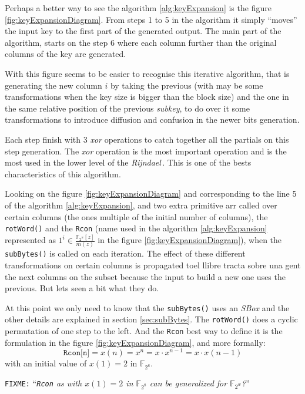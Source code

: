 \documentclass[10pt,a4paper,twoside]{llncs}
\newcommand{\fixme}[1]{\texttt{\color{red}FIXME:} ``\emph{#1}''}
\newcommand{\rijndael}{\emph{Rijndael}}
\newcommand{\Fpn}[2]{\ensuremath{\mathbb{F}_{#1^#2}}}
\begin{document}
Perhaps a better way to see the algorithm \ref{alg:keyExpansion} is the figure \ref{fig:keyExpansionDiagram}. From steps 1 to 5 in the algorithm it simply ``moves'' the input key to the first part of the generated output. The main part of the algorithm, starts on the step 6 where each column further than the original columns of the key are generated.

With this figure seems to be easier to recognise this iterative algorithm, that is generating the new column $i$ by taking the previous (with may be some transformations when the key size is bigger than the block size) and the one in the same relative position of the previous \emph{subkey}, to do over it some transformations to introduce diffusion and confusion in the newer bits generation.

Each step finish with 3 \emph{xor} operations to catch together all the partials on this step generation. The \emph{xor} operation is the most important operation and is the most used in the lower level of the \rijndael\,. This is one of the bests characteristics of this algorithm.

Looking on the figure \ref{fig:keyExpansionDiagram} and corresponding to the line 5 of the algorithm \ref{alg:keyExpansion}, and two extra primitive arr called over certain columns (the ones multiple of the initial number of columns), the {\tt rotWord()} and the {\tt Rcon} (name used in the algorithm \ref{alg:keyExpansion} represented as $1^{i} \in\frac{\mathbb{F}_{2^{w}}[z]}{m(z)}$ in the figure \ref{fig:keyExpansionDiagram}), when the {\tt subBytes()} is called on each iteration. The effect of these different transformations on certain columns is propagated toel llibre tracta sobre una gent the next columns on the subset because the input to build a new one uses the previous. But lets seen a bit what they do.

At this point we only need to know that the {\tt subBytes()} uses an \emph{SBox} and the other details are explained in section \ref{sec:subBytes}. The {\tt rotWord()} does a cyclic permutation of one step to the left. And the {\tt Rcon} best way to define it is the formulation in the figure \ref{fig:keyExpansionDiagram}, and more formally:
\begin{equation}\label{eq:rcon}
    \texttt{Rcon[n]} = x(n) = x^n = x\cdot x^{n-1}=x\cdot x(n-1)
\end{equation}
with an initial value of $x(1)=2$ in \Fpn{2}{8}.

\fixme{{\tt Rcon} as with $x(1)=2$ in \Fpn{2}{8} can be generalized for \Fpn{2}{w}?}
\end{document}
